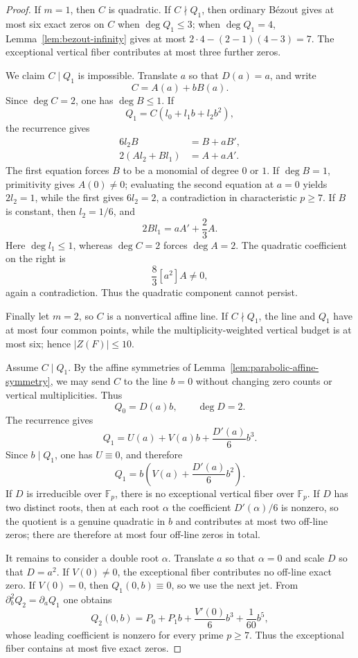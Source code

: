 \documentclass[11pt]{article}
\newcommand{\F}{\mathbb F}
\begin{document}
\begin{proof}
If \(m=1\), then \(C\) is quadratic.  If \(C\nmid Q_1\), then
ordinary B\'ezout gives at most six exact zeros on \(C\) when
\(\deg Q_1\le3\); when \(\deg Q_1=4\),
Lemma~\ref{lem:bezout-infinity} gives at most
\(2\cdot4-(2-1)(4-3)=7\).  The exceptional vertical fiber contributes
at most three further zeros.

We claim \(C\mid Q_1\) is impossible.  Translate \(a\) so that
\(D(a)=a\), and write
\[
 C=A(a)+bB(a).
\]
Since \(\deg C=2\), one has \(\deg B\le1\).  If
\[
 Q_1=C(l_0+l_1b+l_2b^2),
\]
the recurrence gives
\begin{align*}
 6l_2B&=B+aB',\\
 2(A l_2+B l_1)&=A+aA'.
\end{align*}
The first equation forces \(B\) to be a monomial of degree \(0\) or
\(1\).  If \(\deg B=1\), primitivity gives \(A(0)\ne0\); evaluating the
second equation at \(a=0\) yields \(2l_2=1\), while the first gives
\(6l_2=2\), a contradiction in characteristic \(p\ge7\).
If \(B\) is constant, then \(l_2=1/6\), and
\[
 2Bl_1=aA'+\frac23A.
\]
Here \(\deg l_1\le1\), whereas \(\deg C=2\) forces \(\deg A=2\).  The
quadratic coefficient on the right is
\[
 \frac83[a^2]A\ne0,
\]
again a contradiction.  Thus the quadratic component cannot persist.

Finally let \(m=2\), so \(C\) is a nonvertical affine line.  If
\(C\nmid Q_1\), the line and \(Q_1\) have at most four common points,
while the multiplicity-weighted vertical budget is at most six; hence
\(|Z(F)|\le10\).

Assume \(C\mid Q_1\).  By the affine symmetries of
Lemma~\ref{lem:parabolic-affine-symmetry}, we may send \(C\) to the line
\(b=0\) without changing zero counts or vertical multiplicities.  Thus
\[
 Q_0=D(a)b,
 \qquad \deg D=2.
\]
The recurrence gives
\[
 Q_1=U(a)+V(a)b+\frac{D'(a)}6b^3.
\]
Since \(b\mid Q_1\), one has \(U\equiv0\), and therefore
\[
 Q_1=b\left(V(a)+\frac{D'(a)}6b^2\right).
\]
If \(D\) is irreducible over \(\F_p\), there is no exceptional vertical
fiber over \(\F_p\).  If \(D\) has two distinct roots, then at each root
\(\alpha\) the coefficient \(D'(\alpha)/6\) is nonzero, so the quotient is
a genuine quadratic in \(b\) and contributes at most two off-line zeros;
there are therefore at most four off-line zeros in total.

It remains to consider a double root \(\alpha\).  Translate \(a\) so that
\(\alpha=0\) and scale \(D\) so that \(D=a^2\).  If \(V(0)\ne0\), the
exceptional fiber contributes no off-line exact zero.  If \(V(0)=0\), then
\(Q_1(0,b)\equiv0\), so we use the next jet.  From
\(\partial_b^2Q_2=\partial_aQ_1\) one obtains
\[
 Q_2(0,b)=P_0+P_1b+\frac{V'(0)}6b^3+\frac1{60}b^5,
\]
whose leading coefficient is nonzero for every prime \(p\ge7\).  Thus the
exceptional fiber contains at most five exact zeros.


\end{proof}
\end{document}
